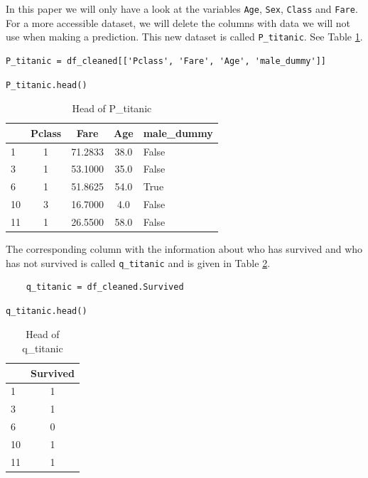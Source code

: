 \documentclass[11pt]{article}
\begin{document}
In this paper we will only have a look at the variables \texttt{Age}, \texttt{Sex}, \texttt{Class} and \texttt{Fare}. For a more accessible dataset, we will delete the columns with data we will not use when making a prediction. This new dataset is called \texttt{P\_titanic}. See Table \ref{tab:ptitanichead}.
\begin{verbatim}
P_titanic = df_cleaned[['Pclass', 'Fare', 'Age', 'male_dummy']]
\end{verbatim}

\begin{verbatim}
P_titanic.head()
\end{verbatim}


\begin{table}
\small
\begin{center}
\caption{\label{tab:ptitanichead}Head of P_titanic}
\begin{tabular}{|l|c|c|c|l|}
\toprule
\hline
{} &  Pclass &     Fare &   Age &  male\_dummy \\
\midrule
\hline
1  &       1 &  71.2833 &  38.0 &       False \\
3  &       1 &  53.1000 &  35.0 &       False \\
6  &       1 &  51.8625 &  54.0 &        True \\
10 &       3 &  16.7000 &   4.0 &       False \\
11 &       1 &  26.5500 &  58.0 &       False \\
\hline
\bottomrule
\end{tabular}
\end{center}
\end{table}



The corresponding column with the information about who has survived and who has not survived is called \texttt{q\_titanic} and is given in Table \ref{tab:qtitanichead}. 


\begin{verbatim}
    q_titanic = df_cleaned.Survived
\end{verbatim}

\begin{verbatim}
q_titanic.head()
\end{verbatim}

\begin{table}
\small
\begin{center}
\caption{\label{tab:qtitanichead}Head of q_titanic}
\begin{tabular}{|l|c|}
\toprule
\hline
{} &  Survived \\
\midrule
\hline
1  &         1 \\
3  &         1 \\
6  &         0 \\
10 &         1 \\
11 &         1 \\
\bottomrule
\hline
\end{tabular}
\end{center}
\end{table}
\end{document}
